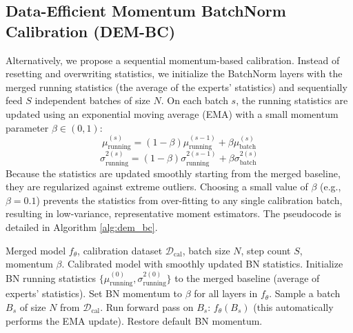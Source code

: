 \documentclass{article}
\begin{document}
\subsection{Data-Efficient Momentum BatchNorm Calibration (DEM-BC)}
Alternatively, we propose a sequential momentum-based calibration. Instead of resetting and overwriting statistics, we initialize the BatchNorm layers with the merged running statistics (the average of the experts' statistics) and sequentially feed $S$ independent batches of size $N$. On each batch $s$, the running statistics are updated using an exponential moving average (EMA) with a small momentum parameter $\beta \in (0, 1)$:
\begin{equation}
    \mu_{\text{running}}^{(s)} = (1 - \beta) \mu_{\text{running}}^{(s-1)} + \beta \mu_{\text{batch}}^{(s)}
\end{equation}
\begin{equation}
    \sigma_{\text{running}}^{2(s)} = (1 - \beta) \sigma_{\text{running}}^{2(s-1)} + \beta \sigma_{\text{batch}}^{2(s)}
\end{equation}
Because the statistics are updated smoothly starting from the merged baseline, they are regularized against extreme outliers. Choosing a small value of $\beta$ (e.g., $\beta = 0.1$) prevents the statistics from over-fitting to any single calibration batch, resulting in low-variance, representative moment estimators. The pseudocode is detailed in Algorithm \ref{alg:dem_bc}.

\begin{algorithm}[tb]
\caption{Data-Efficient Momentum BatchNorm Calibration (DEM-BC)}
\label{alg:dem_bc}
\begin{algorithmic}[1]
 Merged model $f_\theta$, calibration dataset $\mathcal{D}_{\text{cal}}$, batch size $N$, step count $S$, momentum $\beta$.
 Calibrated model with smoothly updated BN statistics.
\STATE Initialize BN running statistics $\{\mu_{\text{running}}^{(0)}, \sigma_{\text{running}}^{2(0)}\}$ to the merged baseline (average of experts' statistics).
\STATE Set BN momentum to $\beta$ for all layers in $f_\theta$.
    \STATE Sample a batch $B_s$ of size $N$ from $\mathcal{D}_{\text{cal}}$.
    \STATE Run forward pass on $B_s$: $f_\theta(B_s)$ (this automatically performs the EMA update).
\ENDFOR
\STATE Restore default BN momentum.
\end{algorithmic}
\end{algorithm}
\end{document}
